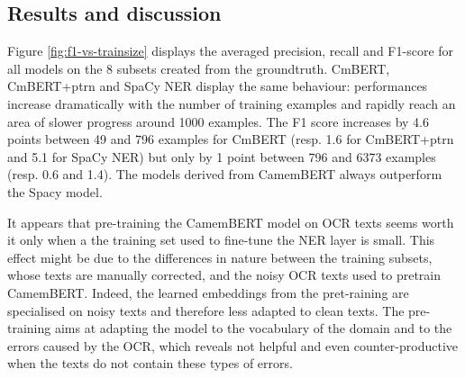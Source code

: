 


\subsection{Results and discussion}
Figure \ref{fig:f1-vs-trainsize} displays the averaged precision, recall and F1-score for all models on the 8 subsets created from the groundtruth.
CmBERT, CmBERT+ptrn and SpaCy NER display the same behaviour: performances increase dramatically with the number of training examples and rapidly reach an area of slower progress around 1000 examples.
The F1 score increases by 4.6 points between 49 and 796 examples for CmBERT (resp. 1.6 for CmBERT+ptrn and 5.1 for SpaCy NER) but only by 1 point between 796 and 6373 examples (resp. 0.6 and 1.4).
The models derived from CamemBERT always outperform the Spacy model.

It appears that pre-training the CamemBERT model on OCR texts seems worth it only when a the training set used to fine-tune the NER layer is small.
This effect might be due to the differences in nature between the training subsets, whose texts are manually corrected, and the noisy OCR texts used to pretrain CamemBERT.
Indeed, the learned embeddings from the pret-raining are specialised on noisy texts and therefore less adapted to clean texts.
The pre-training aims at adapting the model to the vocabulary of the domain and to the errors caused by the OCR, which reveals not helpful and even counter-productive when the texts do not contain these types of errors.

